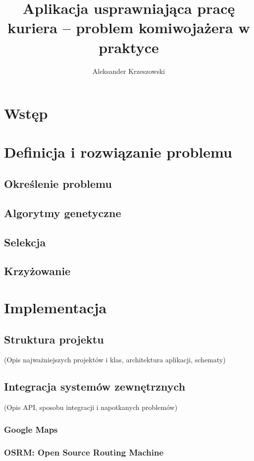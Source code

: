 \documentclass[12pt,a4paper]{report}
\begin{document}
	\author{Aleksander Krzeszowski}
	\title{Aplikacja usprawniająca pracę kuriera -- problem komiwojażera w praktyce}
	
	
	
	\tableofcontents
	
	\chapter*{Wstęp}
		
	\chapter{Definicja i rozwiązanie problemu}
		\label{ch:definicja_i_rozwiazanie}
		\section{Określenie problemu}
			
		\section{Algorytmy genetyczne}
		\section{Selekcja}
		\section{Krzyżowanie}
			
	\chapter{Implementacja}
		\section{Struktura projektu}
			(Opis najważniejszych projektów i klas, architektura aplikacji, schematy)
			
		\section{Integracja systemów zewnętrznych}
			(Opis API, sposobu integracji i napotkanych problemów)
			\subsection{Google Maps}
			\subsection{OSRM: Open Source Routing Machine}
\end{document}
